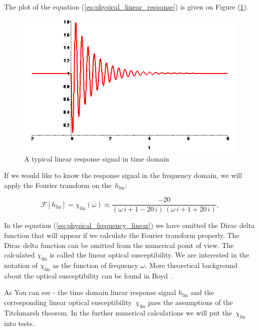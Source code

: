 \documentclass[12pt,twoside,a4paper]{article}
\numberwithin{equation}{subsection}
\numberwithin{figure}{subsection}
\begin{document}
The plot of the equation (\ref{eq:physical_linear_response}) is given on Figure (\ref{fig:physical_linplot}).

\begin{figure}[H]
  \includegraphics[width=150mm]{img/lin_plot.png}
  \caption{A typical linear response signal in time domain \label{fig:physical_linplot}}
\end{figure}

If we would like to know the response signal in the frequency domain, we will apply the Fourier transform on the~$ h_{\text{lin}} $:

\begin{equation} \label{eq:physical_frequency_linear}
  \mathcal{F}[h_{\text{lin}}] = \chi_{\text{lin}}(\omega) \approx \frac{ -20}{(\omega \,i + 1 -20\,i)\,(\omega \,i + 1 + 20\,i)},
\end{equation}

In the equation (\ref{eq:physical_frequency_linear}) we have omitted the Dirac delta function that will appear if we calculate the Fourier
transform properly. The Dirac delta function can be omitted from the numerical point of view. The calculated $ \chi_{\text{lin}} $
is called the linear optical susceptibility. We are interested in the notation of $ \chi_{\text{lin}} $ as the function of frequency
$ \omega $. More theoretical background about the optical susceptibility can be found in Boyd~\cite{boyd_nlo}. 

As You can see - the time domain linear response signal $ h_{\text{lin}} $ and the corresponding linear optical susceptibility~$
\chi_{\text{lin}} $ pass the assumptions of the Titchmarsh theorem. In the further numerical calculations we will put the~$
\chi_{\text{lin}} $ into tests. 
\end{document}
